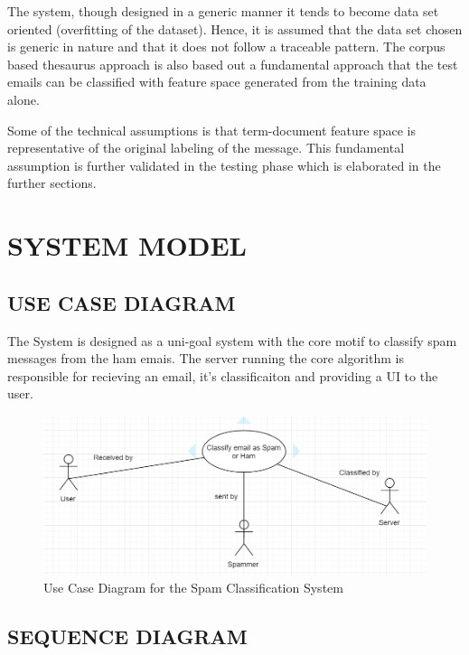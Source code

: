 The system, though designed in a generic manner it tends to become data set oriented (overfitting of the dataset). Hence, it is assumed that the data set chosen is generic in nature and that it does not follow a traceable pattern. The corpus based thesaurus approach is also based out a fundamental approach that the test emails can be classified with feature space generated from the training data alone. 

Some of the technical assumptions is that term-document feature space is representative of the original labeling of the message. This fundamental assumption is further validated in the testing phase which is elaborated in the further sections.  


\section{SYSTEM MODEL}

\subsection{USE CASE DIAGRAM}

The System is designed as a uni-goal system with the core motif to classify spam messages from the ham emais. The server running the core algorithm is responsible for recieving an email, it's classificaiton and providing a UI to the user.
\\
\begin{figure}[ht]
\centering\includegraphics[width=1.0\linewidth]{usecase1.PNG}\caption{Use Case Diagram for the Spam Classification System}
\end{figure}


\subsection{SEQUENCE DIAGRAM}


